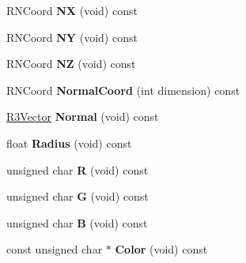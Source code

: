 \begin{DoxyCompactItemize}
\item 
R\+N\+Coord {\bfseries NX} (void) const \hypertarget{class_r3_surfel_point_acece9cf18d6fb491c8a104f68e7d057e}{}\label{class_r3_surfel_point_acece9cf18d6fb491c8a104f68e7d057e}

\item 
R\+N\+Coord {\bfseries NY} (void) const \hypertarget{class_r3_surfel_point_a7de8498bb82d92bee8f8ca55059bc56b}{}\label{class_r3_surfel_point_a7de8498bb82d92bee8f8ca55059bc56b}

\item 
R\+N\+Coord {\bfseries NZ} (void) const \hypertarget{class_r3_surfel_point_a200ee9bd65789ac79fc51385630ebf42}{}\label{class_r3_surfel_point_a200ee9bd65789ac79fc51385630ebf42}

\item 
R\+N\+Coord {\bfseries Normal\+Coord} (int dimension) const \hypertarget{class_r3_surfel_point_a4b82b8e4fdfc3b27050826f2c8545f44}{}\label{class_r3_surfel_point_a4b82b8e4fdfc3b27050826f2c8545f44}

\item 
\hyperlink{class_r3_vector}{R3\+Vector} {\bfseries Normal} (void) const \hypertarget{class_r3_surfel_point_a9f907c4a4989157e2059440fec533c49}{}\label{class_r3_surfel_point_a9f907c4a4989157e2059440fec533c49}

\item 
float {\bfseries Radius} (void) const \hypertarget{class_r3_surfel_point_a3b311e3343ddf27434f4682c673bb5ac}{}\label{class_r3_surfel_point_a3b311e3343ddf27434f4682c673bb5ac}

\item 
unsigned char {\bfseries R} (void) const \hypertarget{class_r3_surfel_point_a32597c65d1603ec4429d39429a7d4ad8}{}\label{class_r3_surfel_point_a32597c65d1603ec4429d39429a7d4ad8}

\item 
unsigned char {\bfseries G} (void) const \hypertarget{class_r3_surfel_point_a9bb30169fcf7c318bc4865c87112e542}{}\label{class_r3_surfel_point_a9bb30169fcf7c318bc4865c87112e542}

\item 
unsigned char {\bfseries B} (void) const \hypertarget{class_r3_surfel_point_a4456abf8b87e24ebe2d1a83cbf84deee}{}\label{class_r3_surfel_point_a4456abf8b87e24ebe2d1a83cbf84deee}

\item 
const unsigned char $\ast$ {\bfseries Color} (void) const \hypertarget{class_r3_surfel_point_a78816c78ab8d4bb2aabd1b5bfeaf9e33}{}\label{class_r3_surfel_point_a78816c78ab8d4bb2aabd1b5bfeaf9e33}


\end{DoxyCompactItemize}
